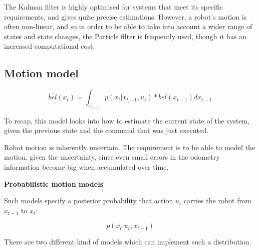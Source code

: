 \documentclass[a4paper]{article}
\begin{document}
The Kalman filter is highly optimised for systems that meet its specific requirements, and gives quite precise estimations. However, a robot's motion is often non-linear, and so in order to be able to take into account a wider range of states and state changes, the Particle filter is frequently used, though it has an increased computational cost.

\subsection{Motion model}

\begin{equation*}
    \overline{bel}(x_t) = \int_{x_{t-1}} \underline{p(x_t | x_{t-1}, u_t)} * bel(x_{t-1}) dx_{t-1}
\end{equation*}

To recap, this model looks into how to estimate the current state of the system, given the previous state and the command that was just executed.

Robot motion is inherently uncertain. The requirement is to be able to model the motion, given the uncertainty, since even small errors in the odometry information become big when accumulated over time.

\textbf{Probabilistic motion models}

Such models specify a posterior probability that action $u_t$ carries the robot from $x_{t-1}$ to $x_t$:

\begin{equation*}
    p(x_t | u_t, x_{t-1})
\end{equation*}

There are two different kind of models which can implement such a distribution.
\end{document}
